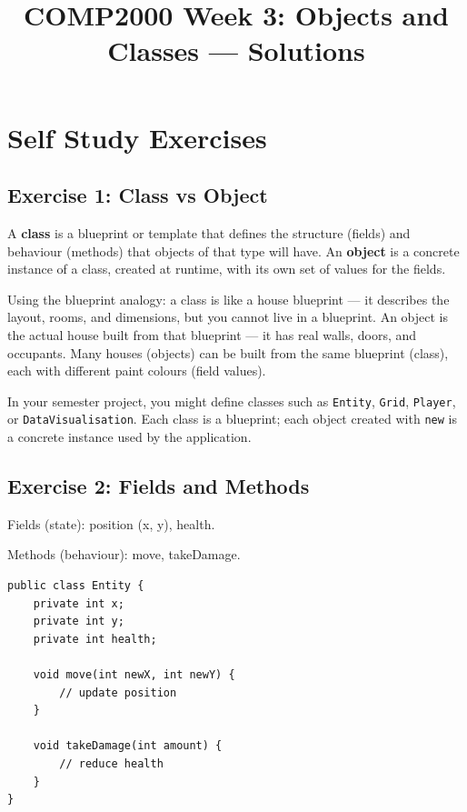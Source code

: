 \documentclass[twoside=false,DIV=14]{scrartcl}
\title{\color{redish} \vspace{-1em}COMP2000 Week 3: Objects and Classes --- Solutions}
\begin{document}
{\color{blackish}\maketitle}\vspace{-7em}

\section*{Self Study Exercises}

\subsection*{Exercise 1: Class vs Object}

A \textbf{class} is a blueprint or template that defines the structure (fields) and behaviour (methods) that objects of that type will have.  An \textbf{object} is a concrete instance of a class, created at runtime, with its own set of values for the fields.

Using the blueprint analogy: a class is like a house blueprint --- it describes the layout, rooms, and dimensions, but you cannot live in a blueprint.  An object is the actual house built from that blueprint --- it has real walls, doors, and occupants.  Many houses (objects) can be built from the same blueprint (class), each with different paint colours (field values).

In your semester project, you might define classes such as \texttt{Entity}, \texttt{Grid}, \texttt{Player}, or \texttt{DataVisualisation}.  Each class is a blueprint; each object created with \texttt{new} is a concrete instance used by the application.

\subsection*{Exercise 2: Fields and Methods}

Fields (state): position (x, y), health.

Methods (behaviour): move, takeDamage.

\begin{lstlisting}
public class Entity {
    private int x;
    private int y;
    private int health;

    void move(int newX, int newY) {
        // update position
    }

    void takeDamage(int amount) {
        // reduce health
    }
}
\end{lstlisting}
\end{document}
